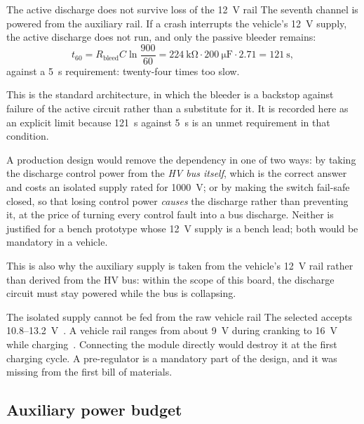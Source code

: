 \begin{finding}{The active discharge does not survive loss of the \SI{12}{\volt} rail}
The seventh channel is powered from the auxiliary rail. If a crash
interrupts the vehicle's \SI{12}{\volt} supply, the active
discharge does not run, and only the passive bleeder remains:
%
\begin{equation}
  t_{60} = R_\mathrm{bleed} C \ln\frac{900}{60}
  = \SI{224}{\kilo\ohm}\cdot\SI{200}{\micro\farad}\cdot 2.71
  = \SI{121}{\second},
\end{equation}
%
against a \SI{5}{\second} requirement: twenty-four times too slow.

This is the standard architecture, in which the bleeder is a backstop
against failure of the active circuit rather than a substitute for it. It is
recorded here as an explicit limit because \SI{121}{\second} against
\SI{5}{\second} is an unmet requirement in that condition.

A production design would remove the dependency in one of two ways: by
taking the discharge control power from the \emph{HV bus itself}, which is
the correct answer and costs an isolated supply rated for
\SI{1000}{\volt}; or by making the switch fail-safe closed, so that losing
control power \emph{causes} the discharge rather than preventing it, at the
price of turning every control fault into a bus discharge. Neither is
justified for a bench prototype whose \SI{12}{\volt} supply is a bench
lead; both would be mandatory in a vehicle.
\end{finding}

This is also why the auxiliary supply is taken from the vehicle's
\SI{12}{\volt} rail rather than derived from the HV bus: within the scope of
this board, the discharge circuit must stay powered while the bus is
collapsing.

\begin{finding}{The isolated supply cannot be fed from the raw vehicle rail}
The selected \dcdc{} accepts \SI{10.8}{}--\SI{13.2}{\volt}~\cite{murata_mgj2}.
A vehicle rail ranges from about \SI{9}{\volt} during cranking to
\SI{16}{\volt} while charging~\cite{iso16750}. Connecting the module directly
would destroy it at the first charging cycle. A pre-regulator is a mandatory
part of the design, and it was missing from the first bill of materials.
\end{finding}

\subsection{Auxiliary power budget}

